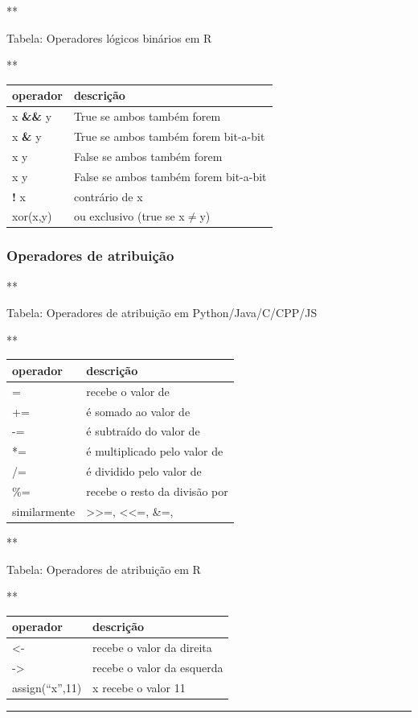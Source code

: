 \documentclass[12pt,a4paper]{article}
\renewcommand{\linethickness}{0.05em}
\begin{document}
    **

Tabela: Operadores lógicos binários em R

**

\begin{longtable}[]{@{}ll@{}}
\toprule
operador & descrição\tabularnewline
\midrule
\endhead
x \textbf{\&\&} y & True se ambos também forem\tabularnewline
x \textbf{\&} y & True se ambos também forem bit-a-bit\tabularnewline
x \textbf{\textbar{}\textbar{}} y & False se ambos também
forem\tabularnewline
x \textbf{\textbar{}} y & False se ambos também forem
bit-a-bit\tabularnewline
\textbf{!} x & contrário de x\tabularnewline
xor(x,y) & ou exclusivo (true se x\(\neq\)y)\tabularnewline
\bottomrule
\end{longtable}

    \hypertarget{operadores-de-atribuiuxe7uxe3o}{%
\subsubsection{Operadores de
atribuição}\label{operadores-de-atribuiuxe7uxe3o}}

    **

Tabela: Operadores de atribuição em Python/Java/C/CPP/JS

**

\begin{longtable}[]{@{}ll@{}}
\toprule
operador & descrição\tabularnewline
\midrule
\endhead
= & recebe o valor de\tabularnewline
+= & é somado ao valor de\tabularnewline
-= & é subtraído do valor de\tabularnewline
*= & é multiplicado pelo valor de\tabularnewline
/= & é dividido pelo valor de\tabularnewline
\%= & recebe o resto da divisão por\tabularnewline
similarmente & \textgreater{}\textgreater{}=, \textless{}\textless{}=,
\&=,\tabularnewline
\bottomrule
\end{longtable}

    **

Tabela: Operadores de atribuição em R

**

\begin{longtable}[]{@{}ll@{}}
\toprule
operador & descrição\tabularnewline
\midrule
\endhead
\textless{}- & recebe o valor da direita\tabularnewline
-\textgreater{} & recebe o valor da esquerda\tabularnewline
assign(``x'',11) & x recebe o valor 11\tabularnewline
\bottomrule
\end{longtable}

    \begin{center}\rule{0.5\linewidth}{\linethickness}\end{center}
\end{document}

